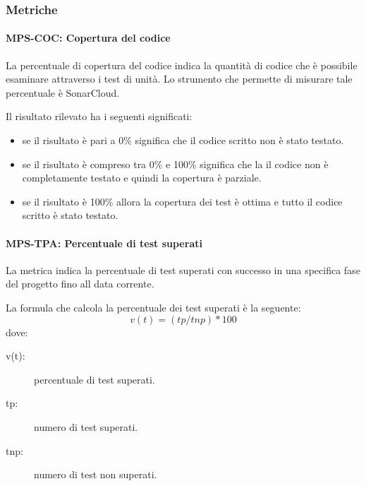 \documentclass[../../norme-di-progetto.tex]{subfiles}
\begin{document}



\subsubsection{Metriche}%
\label{subs:verifica/metriche}

\paragraph{MPS-COC: Copertura del codice}%
\label{par:MPS-COC_copertura_codice}

La percentuale di copertura del codice indica la quantità di codice che è possibile esaminare attraverso i test di unità.
Lo strumento che permette di misurare tale percentuale è SonarCloud.

Il risultato rilevato ha i seguenti significati:
\begin{itemize}
  \item se il risultato è pari a 0\% significa che il codice scritto non è stato testato.
  \item se il risultato è compreso tra 0\% e 100\% significa che la il codice non è completamente testato e quindi la copertura è parziale.
  \item se il risultato è 100\% allora la copertura dei test è ottima e tutto il codice scritto è stato testato.
\end{itemize}



\paragraph{MPS-TPA: Percentuale di test superati}%
\label{par:MPS-TPA_test_passati}

La metrica indica la percentuale di test superati con successo in una specifica fase del progetto fino all data corrente.

La formula che calcola la percentuale dei test superati è la seguente:
\[
 v(t) = (tp / tnp) * 100
\]
dove:
\begin{description}
 \item[v(t):] percentuale di test superati. %
 \item[tp:] numero di test superati.
 \item[tnp:] numero di test non superati.

\end{description}
\end{document}
